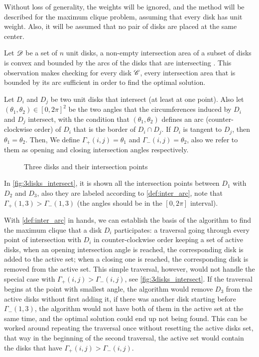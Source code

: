 Without loss of generality, the weights will be ignored, and the method will be described for the maximum clique problem, assuming that every disk has unit weight. Also, it will be assumed that no pair of disks are placed at the same center.

Let $\mathscr{D}$ be a set of $n$ unit disks, a non-empty intersection area of a subset of disks is convex and bounded by the arcs of the disks that are intersecting \cite{inplace:2014}.
This observation makes checking for every disk $\mathscr{C}$, every intersection area that is bounded by its arc sufficient in order to find the optimal solution.

\begin{definicao}\label{def:inter_arc}
    Let $D_i$ and $D_j$ be two unit disks that intersect (at least at one point). Also let $(\theta_1, \theta_2) \in [0,2\pi]^2$ be the two angles that the circumferences induced by $D_i$ and $D_j$ intersect, with the condition that $(\theta_1,\theta_2)$ defines an arc (counter-clockwise order) of $D_i$ that is the border of $D_i \cap D_j$. If $D_i$ is tangent to $D_j$, then $\theta_1=\theta_2$. Then, We define $\Gamma_+(i,j) = \theta_1$ and $\Gamma_-(i,j) = \theta_2$, also we refer to them as opening and closing intersection angles respectively.
\end{definicao}

\begin{figure}[H]
\centering

    \caption{Three disks and their intersection points}
    
    \fautor
    \label{fig:3disks_intersect}
\end{figure}

In \autoref{fig:3disks_intersect}, it is shown all the intersection points between $D_1$ with $D_2$ and $D_3$, also they are labeled according to \autoref{def:inter_arc}, note that $\Gamma_+(1,3) > \Gamma_-(1,3)$ (the angles should be in the $[0,2\pi]$ interval).

With \autoref{def:inter_arc} in hands, we can establish the basis of the algorithm to find the maximum clique that a disk $D_i$ participates: a traversal going through every point of intersection with $D_i$ in counter-clockwise order keeping a set of active disks, when an opening intersection angle is reached, the corresponding disk is added to the active set; when a closing one is reached, the corresponding disk is removed from the active set.
This simple traversal, however, would not handle the special case with $\Gamma_+(i,j) > \Gamma_-(i,j)$, see \autoref{fig:3disks_intersect}. If the traversal begins at the point with smallest angle, the algorithm would remove $D_3$ from the active disks without first adding it, if there was another disk starting before $\Gamma_-(1,3)$, the algorithm would not have both of them in the active set at the same time, and the optimal solution could end up not being found. This can be worked around repeating the traversal once without resetting the active disks set, that way in the beginning of the second traversal, the active set would contain the disks that have $\Gamma_+(i,j) > \Gamma_-(i,j)$.


